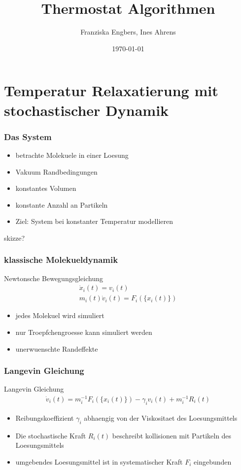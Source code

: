\documentclass{beamer}
\title{Thermostat Algorithmen}
\author{Franziska Engbers, Ines Ahrens}
\date{\today}
\begin{document}
\maketitle
\frame{\tableofcontents[currentsection]}

\section{Temperatur Relaxatierung mit stochastischer Dynamik}

\begin{frame}
	\frametitle{Das System}
	\begin{itemize}
		\item betrachte Molekuele in einer Loesung
		\item Vakuum Randbedingungen
		\item konstantes Volumen
		\item konstante Anzahl an Partikeln
		\item Ziel: System bei konstanter Temperatur modellieren		
	\end{itemize}
	skizze?
\end{frame}

\begin{frame} 
  \frametitle{klassische Molekueldynamik}
  \begin{block}{Newtonsche Bewegungsgleichung} 
	\begin{align*}
	\dot{x}_i(t) = v_i(t) \\
	m_i(t) \dot{v}_i(t) = F_i(\{ x_i(t)\}) 
	\end{align*}
  \end{block}
  \begin{itemize}
  	\item jedes Molekuel wird simuliert
  	\item nur Troepfchengroesse kann simuliert werden 
  	\item unerwuenschte Randeffekte
  \end{itemize}
  \end{frame}
  
  \begin{frame}
  \frametitle{Langevin Gleichung}
  \begin{block}{Langevin Gleichung} %
	\begin{align*}
	\dot{v}_i(t)  = m_i^{-1} F_i(\{x_i(t)\}) - \gamma_i v_i(t) + m_i^{-1} R_i(t)
	\end{align*}
  \end{block}  
  \begin{itemize}
  	\item Reibungskoeffizient $\gamma_i$ abhaengig von der Viskositaet des Loesungsmittels
  	\item Die stochastische Kraft $R_i(t)$ beschreibt kollisionen mit Partikeln des Loesungsmittels
  	\item umgebendes Loesungsmittel ist in systematischer Kraft $F_i$ eingebunden
  \end{itemize}
  
\end{frame}
\end{document}
